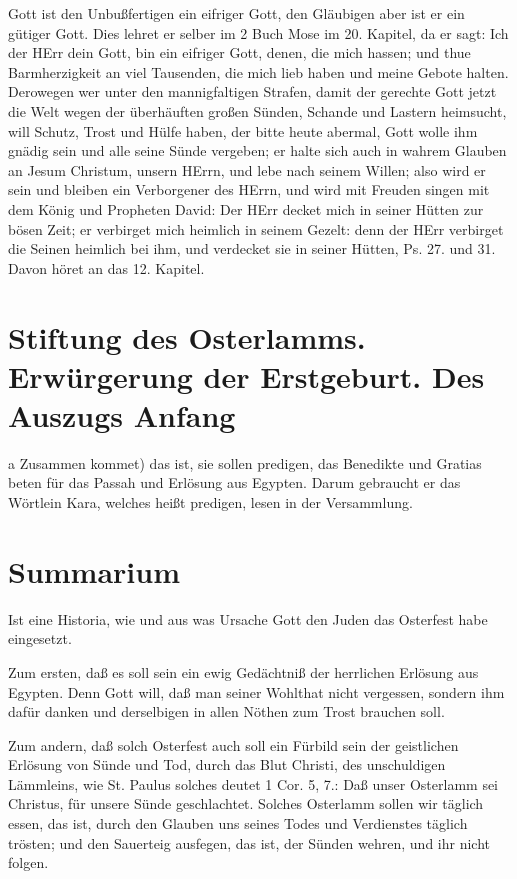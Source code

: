 Gott ist den Unbußfertigen ein eifriger Gott, den Gläubigen aber ist er ein gütiger Gott. Dies lehret er selber im 2 Buch Mose im 20. Kapitel, da er sagt: Ich der HErr dein Gott, bin ein eifriger Gott, denen, die mich hassen; und thue Barmherzigkeit an viel Tausenden, die mich lieb haben und meine Gebote halten. Derowegen wer unter den mannigfaltigen Strafen, damit der gerechte Gott jetzt die Welt wegen der überhäuften großen Sünden, Schande und Lastern heimsucht, will Schutz, Trost und Hülfe haben, der bitte heute abermal, Gott wolle ihm gnädig sein und alle seine Sünde vergeben; er halte sich auch in wahrem Glauben an Jesum Christum, unsern HErrn, und lebe nach seinem Willen; also wird er sein und bleiben ein Verborgener des HErrn, und wird mit Freuden singen mit dem König und Propheten David: Der HErr decket mich in seiner Hütten zur bösen Zeit; er verbirget mich heimlich in seinem Gezelt: denn der HErr verbirget die Seinen heimlich bei ihm, und verdecket sie in seiner Hütten, Ps. 27. und 31. Davon höret an das 12. Kapitel.

\section[Stiftung des Osterlamms. Erwürgerung der Erstgeburt. Des Auszugs]{Stiftung des Osterlamms. Erwürgerung der Erstgeburt. Des Auszugs Anfang}

a Zusammen kommet) das ist, sie sollen predigen, das Benedikte und Gratias beten für das Passah und Erlösung aus Egypten. Darum gebraucht er das Wörtlein Kara, welches heißt predigen, lesen in der Versammlung.

\section{Summarium}

Ist eine Historia, wie und aus was Ursache Gott den Juden das Osterfest habe eingesetzt.

Zum ersten, daß es soll sein ein ewig Gedächtniß der herrlichen Erlösung aus Egypten. Denn Gott will, daß man seiner Wohlthat nicht vergessen, sondern ihm dafür danken und derselbigen in allen Nöthen zum Trost brauchen soll.

Zum andern, daß solch Osterfest auch soll ein Fürbild sein der geistlichen Erlösung von Sünde und Tod, durch das Blut Christi, des unschuldigen Lämmleins, wie St. Paulus solches deutet 1 Cor. 5, 7.: Daß unser Osterlamm sei Christus, für unsere Sünde geschlachtet. Solches Osterlamm sollen wir täglich essen, das ist, durch den Glauben uns seines Todes und Verdienstes täglich trösten; und den Sauerteig ausfegen, das ist, der Sünden wehren, und ihr nicht folgen.

